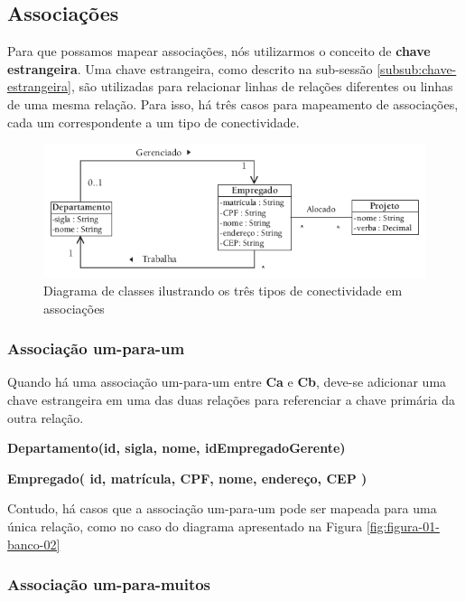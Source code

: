\subsection{Associações}

Para que possamos mapear associações, nós utilizarmos o conceito de \textbf{chave estrangeira}. Uma chave estrangeira, como descrito na sub-sessão \ref{subsub:chave-estrangeira}, são utilizadas para relacionar linhas de relações diferentes ou linhas de uma mesma relação. Para isso, há três casos para mapeamento de associações, cada um correspondente a um tipo de conectividade.

\begin{figure}[H]
	\centering
	\includegraphics[scale=0.8]{imagens/tipos-de-conectividade.png}
	\caption{Diagrama de classes ilustrando os três tipos de conectividade em associações}
	\label{fig:figura-01-banco-04}
\end{figure}

\subsubsection{Associação um-para-um}

Quando há uma associação um-para-um entre \textbf{Ca} e \textbf{Cb}, deve-se adicionar uma chave estrangeira em uma das duas relações para referenciar a chave primária da outra relação.

\textbf{Departamento(id, sigla, nome, idEmpregadoGerente)}

\textbf{Empregado( id, matrícula, CPF, nome, endereço, CEP )}

Contudo, há casos que a associação um-para-um pode ser mapeada para uma única relação, como no caso do diagrama apresentado na Figura \ref{fig:figura-01-banco-02}

\subsubsection{Associação um-para-muitos}


